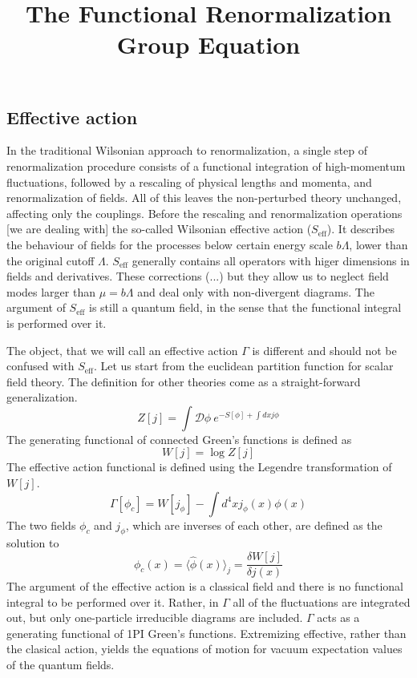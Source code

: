 \documentclass[11pt, a4paper]{article}
\title{\vspace{-2cm}The Functional Renormalization Group Equation}
\date{}
\begin{document}
\maketitle


\subsection*{\centering Effective action}

In the traditional Wilsonian approach to renormalization, a single step of renormalization procedure consists of
a functional integration of high-momentum fluctuations, followed by a rescaling of physical lengths and momenta, and
renormalization of fields. All of this leaves the non-perturbed theory unchanged, affecting only the couplings.
Before the rescaling and renormalization operations [we are dealing with] the so-called Wilsonian effective action ($S_{\text{eff}}$).
It describes the behaviour of fields for the processes below certain energy scale $b\Lambda$, lower than the original cutoff $\Lambda$.
$S_{\text{eff}}$ generally contains all operators with higer dimensions in fields and derivatives.
These corrections (...) but they allow us to neglect field modes larger than $\mu = b\Lambda$ and deal only with non-divergent diagrams.
The argument of $S_{\text{eff}}$ is still a quantum field, in the sense that the functional integral is performed over it. %

The object, that we will call an effective action $\Gamma$ is different and should not be confused with $S_{\text{eff}}$.
Let us start from the euclidean partition function for scalar field theory. The definition for other theories
come as a straight-forward generalization.
\begin{equation}
    Z[j] = \int \mathcal{D}\phi \ e^{-S[\phi] + \int dx j \phi}
\end{equation}
The generating functional of connected Green's functions is defined as
\begin{equation}
    W[j] = \log{Z[j]}
\end{equation}
The effective action functional is defined using the Legendre transformation of $W[j]$.
\begin{equation}
    \Gamma[\phi_c] = W[j_\phi] - \int d^4 x j_\phi(x) \phi(x)
\end{equation}
The two fields $\phi_c$ and $j_\phi$, which are inverses of each other, are defined as the solution to
\begin{equation}
    \phi_c(x) = \langle \hat\phi (x) \rangle_j = \frac{\delta W[j]}{\delta j(x)}
\end{equation}
The argument of the effective action is a classical field and there is no functional integral to be performed over it.
Rather, in $\Gamma$ all of the fluctuations are integrated out, but only one-particle irreducible diagrams
are included. $\Gamma$ acts as a generating functional of 1PI Green's functions. Extremizing effective, rather than
the clasical action, yields the equations of motion for vacuum expectation values of the quantum fields.
\end{document}
